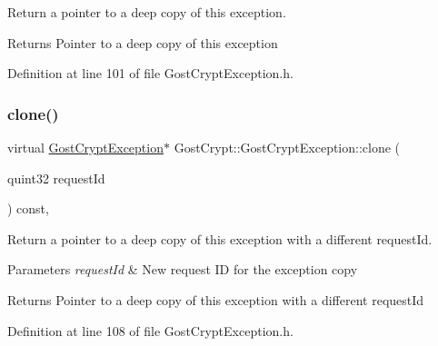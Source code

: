 Return a pointer to a deep copy of this exception. 

\begin{DoxyReturn}{Returns}
Pointer to a deep copy of this exception 
\end{DoxyReturn}


Definition at line 101 of file Gost\+Crypt\+Exception.\+h.

\mbox{\label{class_gost_crypt_1_1_gost_crypt_exception_aa1b8a52f47d58a06d931f2a30618a380}} 
\subsubsection{\texorpdfstring{clone()}{clone()}\hspace{0.1cm}{\footnotesize\ttfamily [2/2]}}
{\footnotesize\ttfamily virtual \hyperlink{class_gost_crypt_1_1_gost_crypt_exception}{Gost\+Crypt\+Exception}$\ast$ Gost\+Crypt\+::\+Gost\+Crypt\+Exception\+::clone (\begin{DoxyParamCaption}\item[{quint32}]{request\+Id }\end{DoxyParamCaption}) const\hspace{0.3cm}{\ttfamily [inline]}, {\ttfamily [virtual]}}



Return a pointer to a deep copy of this exception with a different request\+Id. 


\begin{DoxyParams}{Parameters}
{\em request\+Id} & New request ID for the exception copy \\
\hline
\end{DoxyParams}
\begin{DoxyReturn}{Returns}
Pointer to a deep copy of this exception with a different request\+Id 
\end{DoxyReturn}


Definition at line 108 of file Gost\+Crypt\+Exception.\+h.

\mbox{\label{class_gost_crypt_1_1_gost_crypt_exception_a65d2a9d456facdbd25d990d2e0b46633}} 

